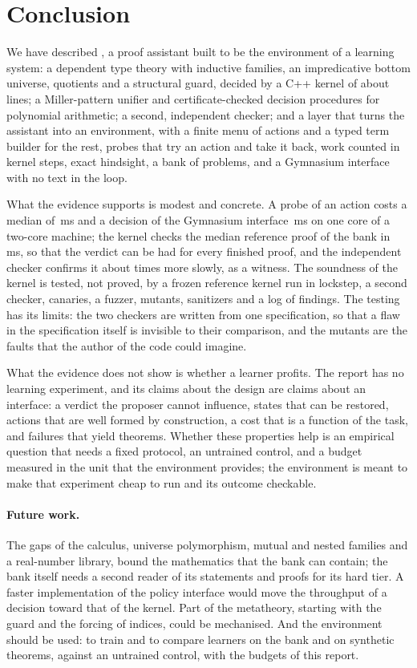 \section{Conclusion}\label{sec:conclusion}

We have described \ITP, a proof assistant built to be the environment of a learning system: a dependent type theory with inductive families, an impredicative bottom universe, quotients and a structural guard, decided by a C++ kernel of about \locKernelHeader{} lines; a Miller-pattern unifier and certificate-checked decision procedures for polynomial arithmetic; a second, independent checker; and a layer that turns the assistant into an environment, with a finite menu of actions and a typed term builder for the rest, probes that try an action and take it back, work counted in kernel steps, exact hindsight, a bank of \bankProblems{} problems, and a Gymnasium interface with no text in the loop.

What the evidence supports is modest and concrete.
A probe of an action costs a median of \probeMed\,ms and a decision of the Gymnasium interface \decMed\,ms on one core of a two-core machine; the kernel checks the median reference proof of the bank in \chkKernelMedianMs\,ms, so that the verdict can be had for every finished proof, and the independent checker confirms it about \chkRatioMedian{} times more slowly, as a witness.
The soundness of the kernel is tested, not proved, by a frozen reference kernel run in lockstep, a second checker, canaries, a fuzzer, \mutTotal{} mutants, sanitizers and a log of \findNumbers{} findings.
The testing has its limits: the two checkers are written from one specification, so that a flaw in the specification itself is invisible to their comparison, and the mutants are the faults that the author of the code could imagine.

What the evidence does not show is whether a learner profits.
The report has no learning experiment, and its claims about the design are claims about an interface: a verdict the proposer cannot influence, states that can be restored, actions that are well formed by construction, a cost that is a function of the task, and failures that yield theorems.
Whether these properties help is an empirical question that needs a fixed protocol, an untrained control, and a budget measured in the unit that the environment provides; the environment is meant to make that experiment cheap to run and its outcome checkable.

\paragraph{Future work.}
The gaps of the calculus, universe polymorphism, mutual and nested families and a real-number library, bound the mathematics that the bank can contain; the bank itself needs a second reader of its statements and proofs for its hard tier.
A faster implementation of the policy interface would move the throughput of a decision toward that of the kernel.
Part of the metatheory, starting with the guard and the forcing of indices, could be mechanised.
And the environment should be used: to train and to compare learners on the bank and on synthetic theorems, against an untrained control, with the budgets of this report.

